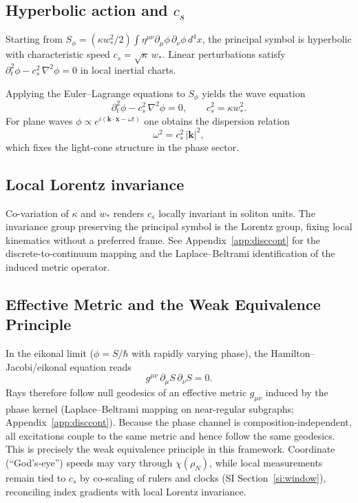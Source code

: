 \documentclass[11pt]{article}
\begin{document}
\subsection{Hyperbolic action and $c_s$}
Starting from $S_\phi = (\kappa w_*^2/2)\int \eta^{\mu\nu} \partial_\mu\phi\,\partial_\nu\phi\,d^4x$, the principal symbol is hyperbolic with characteristic speed $c_s = \sqrt{\kappa}\,w_*$. Linear perturbations satisfy $\partial_t^2\phi - c_s^2\,\nabla^2\phi = 0$ in local inertial charts.

Applying the Euler--Lagrange equations to $S_\phi$ yields the wave equation
\begin{equation}
  \partial_t^2\phi - c_s^2\,\nabla^2\phi = 0,\qquad c_s^2 = \kappa w_*^2.
\end{equation}
For plane waves $\phi \propto e^{i(\mathbf k\cdot \mathbf x - \omega t)}$ one obtains the dispersion relation
\begin{equation}
  \omega^2 = c_s^2\,|\mathbf k|^2,\label{eq:dispersion}
\end{equation}
which fixes the light-cone structure in the phase sector.

\subsection{Local Lorentz invariance}
Co-variation of $\kappa$ and $w_*$ renders $c_s$ locally invariant in soliton units. The invariance group preserving the principal symbol is the Lorentz group, fixing local kinematics without a preferred frame.
See Appendix~\ref{app:disccont} for the discrete-to-continuum mapping and the Laplace--Beltrami identification of the induced metric operator.

\subsection{Effective Metric and the Weak Equivalence Principle}
In the eikonal limit ($\phi = S/\hbar$ with rapidly varying phase), the Hamilton--Jacobi/eikonal equation reads
\begin{equation}
  g^{\mu\nu}\,\partial_\mu S\,\partial_\nu S = 0.
\end{equation}
Rays therefore follow null geodesics of an effective metric $g_{\mu\nu}$ induced by the phase kernel (Laplace--Beltrami mapping on near-regular subgraphs; Appendix~\ref{app:disccont}). Because the phase channel is composition-independent, all excitations couple to the same metric and hence follow the same geodesics. This is precisely the weak equivalence principle in this framework. Coordinate (``God's-eye'') speeds may vary through $\chi(\rho_N)$, while local measurements remain tied to $c_s$ by co-scaling of rulers and clocks (SI Section~\ref{si:window}), reconciling index gradients with local Lorentz invariance.
\end{document}
